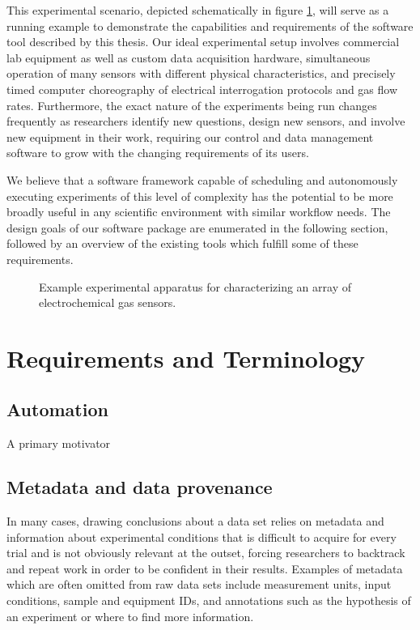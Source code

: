 \documentclass[../thesis]{subfiles}
\begin{document}
This experimental scenario, depicted schematically in figure
\ref{fig:EchemUseCase},
will serve as a running example to demonstrate the
capabilities and requirements of the software tool described by this
thesis. Our ideal experimental setup involves commercial lab equipment
as well as custom data acquisition hardware, simultaneous operation of
many sensors with different physical characteristics, and precisely
timed computer choreography of electrical interrogation protocols and
gas flow rates. Furthermore, the exact nature of the experiments being
run changes frequently as researchers identify new questions, design
new sensors, and involve new equipment in their work,
requiring our control and data management software to grow with the
changing requirements of its users.

We believe that a software framework capable of scheduling and
autonomously executing experiments of this level of complexity has the
potential to be more broadly useful in any scientific environment with
similar workflow needs.
The design goals of our software package are enumerated in the
following section, followed by an overview of the existing tools which
fulfill some of these requirements.

\begin{figure}
  \caption{Example experimental apparatus for characterizing an array
    of electrochemical gas sensors. \label{fig:EchemUseCase}}
\end{figure}


\section{Requirements and Terminology}


\subsection{Automation}
A primary motivator

\subsection{Metadata and data provenance}
In many cases, drawing conclusions about a data set relies on
metadata and information about experimental conditions that is
difficult to acquire for every trial and is not obviously
relevant at the outset, forcing researchers to backtrack and repeat
work in order to be confident in their results. Examples of
metadata which are often omitted from raw data sets include
measurement units, input conditions, sample and equipment IDs, and
annotations such as the hypothesis of an experiment or where to find
more information.
\end{document}
